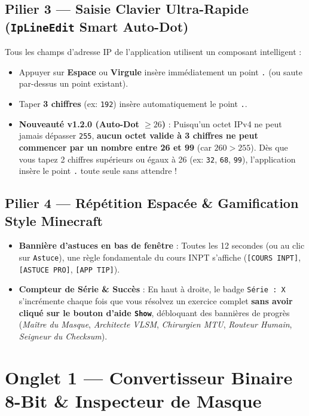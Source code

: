 \documentclass[11pt,a4paper]{article}
\begin{document}
\subsection{Pilier 3 — Saisie Clavier Ultra-Rapide (\texttt{IpLineEdit} Smart Auto-Dot)}
Tous les champs d'adresse IP de l'application utilisent un composant intelligent :
\begin{itemize}
    \item Appuyer sur \textbf{Espace} ou \textbf{Virgule} insère immédiatement un point \texttt{.} (ou saute par-dessus un point existant).
    \item Taper \textbf{3 chiffres} (ex: \texttt{192}) insère automatiquement le point \texttt{.}.
    \item \textbf{Nouveauté v1.2.0 (Auto-Dot $\ge 26$)} : Puisqu'un octet IPv4 ne peut jamais dépasser \texttt{255}, \textbf{aucun octet valide à 3 chiffres ne peut commencer par un nombre entre 26 et 99} (car $260 > 255$). Dès que vous tapez 2 chiffres supérieurs ou égaux à 26 (ex: \texttt{32}, \texttt{68}, \texttt{99}), l'application insère le point \texttt{.} toute seule sans attendre !
\end{itemize}

\subsection{Pilier 4 — Répétition Espacée \& Gamification Style Minecraft}
\begin{itemize}
    \item \textbf{Bannière d'astuces en bas de fenêtre} : Toutes les 12 secondes (ou au clic sur \texttt{Astuce}), une règle fondamentale du cours INPT s'affiche (\texttt{[COURS INPT]}, \texttt{[ASTUCE PRO]}, \texttt{[APP TIP]}).
    \item \textbf{Compteur de Série \& Succès} : En haut à droite, le badge \texttt{Série : X} s'incrémente chaque fois que vous résolvez un exercice complet \textbf{sans avoir cliqué sur le bouton d'aide \texttt{Show}}, débloquant des bannières de progrès (\textit{Maître du Masque}, \textit{Architecte VLSM}, \textit{Chirurgien MTU}, \textit{Routeur Humain}, \textit{Seigneur du Checksum}).
\end{itemize}

\newpage
\section{Onglet 1 — Convertisseur Binaire 8-Bit \& Inspecteur de Masque}
\end{document}
